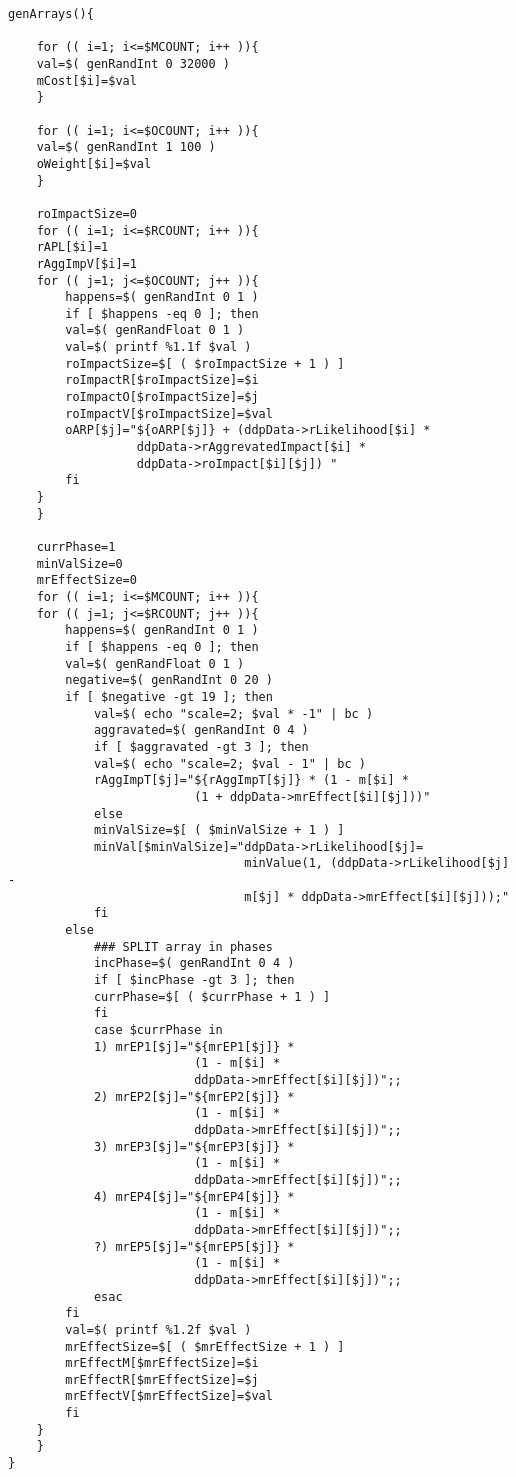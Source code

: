 \begin{tiny}
\begin{verbatim}
genArrays(){

    for (( i=1; i<=$MCOUNT; i++ )){
	val=$( genRandInt 0 32000 )
	mCost[$i]=$val
    }

    for (( i=1; i<=$OCOUNT; i++ )){
	val=$( genRandInt 1 100 )
	oWeight[$i]=$val
    }
    
    roImpactSize=0
    for (( i=1; i<=$RCOUNT; i++ )){
	rAPL[$i]=1
	rAggImpV[$i]=1
	for (( j=1; j<=$OCOUNT; j++ )){
	    happens=$( genRandInt 0 1 )
	    if [ $happens -eq 0 ]; then
		val=$( genRandFloat 0 1 )
		val=$( printf %1.1f $val )
		roImpactSize=$[ ( $roImpactSize + 1 ) ]
		roImpactR[$roImpactSize]=$i
		roImpactO[$roImpactSize]=$j
		roImpactV[$roImpactSize]=$val
		oARP[$j]="${oARP[$j]} + (ddpData->rLikelihood[$i] *
		          ddpData->rAggrevatedImpact[$i] *
		          ddpData->roImpact[$i][$j]) "
	    fi
	}
    }

    currPhase=1
    minValSize=0
    mrEffectSize=0
    for (( i=1; i<=$MCOUNT; i++ )){
	for (( j=1; j<=$RCOUNT; j++ )){
	    happens=$( genRandInt 0 1 )
	    if [ $happens -eq 0 ]; then
		val=$( genRandFloat 0 1 )
		negative=$( genRandInt 0 20 )
		if [ $negative -gt 19 ]; then
		    val=$( echo "scale=2; $val * -1" | bc )
		    aggravated=$( genRandInt 0 4 )
		    if [ $aggravated -gt 3 ]; then
			val=$( echo "scale=2; $val - 1" | bc )
			rAggImpT[$j]="${rAggImpT[$j]} * (1 - m[$i] *
			              (1 + ddpData->mrEffect[$i][$j]))"
		    else
			minValSize=$[ ( $minValSize + 1 ) ]
			minVal[$minValSize]="ddpData->rLikelihood[$j]=
			                     minValue(1, (ddpData->rLikelihood[$j] -
			                     m[$j] * ddpData->mrEffect[$i][$j]));"
		    fi
		else
		    ### SPLIT array in phases
		    incPhase=$( genRandInt 0 4 )
		    if [ $incPhase -gt 3 ]; then
			currPhase=$[ ( $currPhase + 1 ) ]
		    fi
		    case $currPhase in
			1) mrEP1[$j]="${mrEP1[$j]} *
			              (1 - m[$i] * 
			              ddpData->mrEffect[$i][$j])";;
			2) mrEP2[$j]="${mrEP2[$j]} *
			              (1 - m[$i] *
			              ddpData->mrEffect[$i][$j])";;
			3) mrEP3[$j]="${mrEP3[$j]} *
			              (1 - m[$i] *
			              ddpData->mrEffect[$i][$j])";;
			4) mrEP4[$j]="${mrEP4[$j]} *
			              (1 - m[$i] *
			              ddpData->mrEffect[$i][$j])";;
			?) mrEP5[$j]="${mrEP5[$j]} *
			              (1 - m[$i] *
			              ddpData->mrEffect[$i][$j])";;
		    esac
		fi
		val=$( printf %1.2f $val )
		mrEffectSize=$[ ( $mrEffectSize + 1 ) ]
		mrEffectM[$mrEffectSize]=$i
		mrEffectR[$mrEffectSize]=$j
		mrEffectV[$mrEffectSize]=$val
	    fi
	}
    }
}


\end{verbatim}
\end{tiny}
